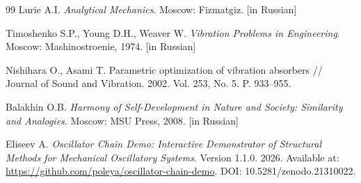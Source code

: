 \documentclass[12pt, a4paper]{article}
\begin{document}
\begin{thebibliography}{99}
		Lurie A.I.
		\textit{Analytical Mechanics}.
		Moscow: Fizmatgiz. [in Russian]
		
		Timoshenko S.P., Young D.H., Weaver W.
		\textit{Vibration Problems in Engineering}.
		Moscow: Mashinostroenie, 1974. [in Russian]
		
		Nishihara O., Asami T.
		Parametric optimization of vibration absorbers
		// Journal of Sound and Vibration. 2002. Vol. 253, No. 5. P. 933--955.
		
		Balakhin O.B.
		\textit{Harmony of Self-Development in Nature and Society: Similarity and Analogies}.
		Moscow: MSU Press, 2008. [in Russian]
		
		Eliseev A.
		\textit{Oscillator Chain Demo: Interactive Demonstrator of Structural Methods for Mechanical Oscillatory Systems}.
		Version 1.1.0. 2026.
		Available at: \url{https://github.com/poleya/oscillator-chain-demo}.
		DOI: 10.5281/zenodo.21310022.
		
	\end{thebibliography}	
	
\end{document}
